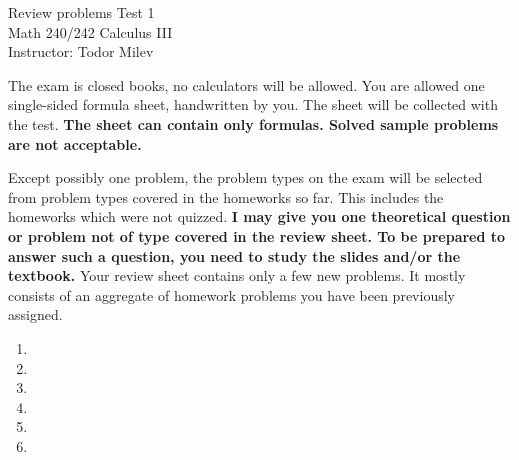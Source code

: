 \documentclass{article}
\begin{document}
\begin{center}
\Large
Review problems Test 1\\ Math 240/242 Calculus III \\ \normalsize Instructor: Todor Milev
\end{center}


\noindent The exam is closed books, no calculators will be allowed. You are allowed one single-sided formula sheet, handwritten by you. The sheet will be collected with the test. \textbf{The sheet can contain only formulas. Solved sample problems are not acceptable.}


Except possibly one problem, the problem types on the exam will be selected from problem types covered in the homeworks so far. This includes the homeworks which were not quizzed. \textbf{I may give you one theoretical question or problem not of type covered in the review sheet. To be prepared to answer such a question, you need to study the slides and/or the textbook.} Your review sheet contains only a few new problems. It mostly consists of an aggregate of homework problems you have been previously assigned. 

\begin{enumerate}
\item 

\item  
\item 



\item 
\item 

\item 

\end{enumerate}
\end{document}
